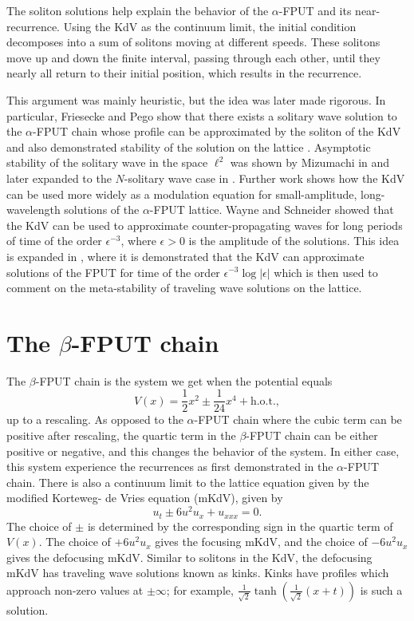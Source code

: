 The soliton solutions help explain the behavior of the \(\alpha\)-FPUT and its near-recurrence. Using the KdV as the continuum limit, the initial condition decomposes into a sum of solitons moving at different speeds. These solitons move up and down the finite interval, passing through each other, until they nearly all return to their initial position, which results in the recurrence. 

This argument was mainly heuristic, but the idea was later made rigorous. In particular, Friesecke and Pego show that there exists a solitary wave solution to the \(\alpha\)-FPUT chain whose profile can be approximated by the soliton of the KdV and also demonstrated stability of the solution on the lattice \cite{friesecke1999solitary,friesecke2002solitary,friesecke2003solitary,friesecke2004solitary}. Asymptotic stability of the solitary wave in the space \(\ell^2\) was shown by Mizumachi in \cite{mizumachi2009asymptotic} and later expanded to the \(N\)-solitary wave case in \cite{mizumachi2013asymptotic}. Further work shows how the KdV can be used more widely as a modulation equation for small-amplitude, long-wavelength solutions of the \(\alpha\)-FPUT lattice. Wayne and Schneider showed that the KdV can be used to approximate counter-propagating waves for long periods of time \cite{schneider2000counter} of the order \(\epsilon^{-3}\), where \(\epsilon > 0\) is the amplitude of the solutions. This idea is expanded in \cite{khan2017long}, where it is demonstrated that the KdV can approximate solutions of the FPUT for time of the order \(\epsilon^{-3}\log |\epsilon|\) which is then used to comment on the meta-stability of traveling wave solutions on the lattice. 

\section{The \(\beta\)-FPUT chain}

The \(\beta\)-FPUT chain is the system we get when the potential equals
\begin{equation}
	V(x) = \frac 12 x^2 \pm \frac 1 {24}x^4 + \text{h.o.t.},
\end{equation}
up to a rescaling. As opposed to the \(\alpha\)-FPUT chain where the cubic term can be positive after rescaling, the quartic term in the \(\beta\)-FPUT chain can be either positive or negative, and this changes the behavior of the system. In either case, this system  experience the recurrences as first demonstrated in the \(\alpha\)-FPUT chain. There is also a continuum limit to the lattice equation given by the modified Korteweg- de Vries equation (mKdV), given by 
\begin{equation}
	u_t \pm 6 u^2 u_x + u_{xxx} = 0.
\end{equation}
The choice of \(\pm\) is determined by the corresponding sign in the quartic term of \(V(x)\). The choice of \(+6u^2u_x\) gives the focusing mKdV, and the choice of \(-6u^2u_x\) gives the defocusing mKdV. Similar to solitons in the KdV, the defocusing mKdV has traveling wave solutions known as kinks. Kinks have profiles which approach non-zero values at \(\pm \infty\); for example, \(\frac 1 {\sqrt 2} \tanh(\frac 1 {\sqrt 2} (x+t))\) is such a solution.

